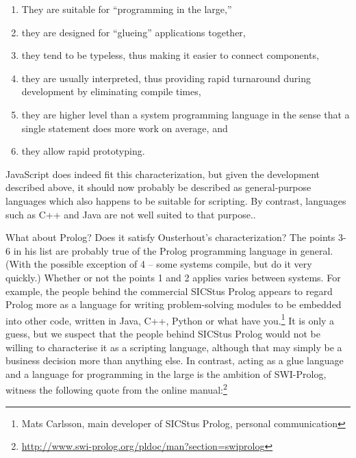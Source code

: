 \renewcommand{\theenumi}{\arabic{enumi}}
\begin{enumerate}

\item They are suitable for ``programming in the large,''

\item they are designed for ``glueing'' applications together,

\item they tend to be typeless, thus making it easier to connect components,

\item they are usually interpreted, thus providing rapid turnaround during development by eliminating compile times,

\item they are higher level than a system programming language in the sense that a single statement does more work on average, and

\item they allow rapid prototyping.

\end{enumerate}
\renewcommand{\theenumi}{\arabic{enumi}}

\noindent JavaScript does indeed fit this characterization, but given the development described above, it should now probably be described as general-purpose languages which also happens to be suitable for scripting. By contrast, languages such as C++ and Java are not well suited to that purpose..

What about Prolog? Does it satisfy Ousterhout's characterization? The points 3-6 in his list are probably true of the Prolog programming language in general. (With the possible exception of 4 -- some systems compile, but do it very quickly.) Whether or not the points 1 and 2 applies varies between systems. For example, the people behind the commercial SICStus Prolog appears to regard Prolog more as a language for writing problem-solving modules to be embedded into other code, written in Java, C++, Python or what have you.\footnote{Mats Carlsson, main developer of SICStus Prolog, personal communication} It is only a guess, but we suspect that the people behind SICStus Prolog would not be willing to characterise it as a scripting language, although that may simply be a business decision more than anything else. In contrast, acting as a glue language and a language for programming in the large is the ambition of SWI-Prolog, witness the following quote from the online manual:\footnote{\url{http://www.swi-prolog.org/pldoc/man?section=swiprolog}}

